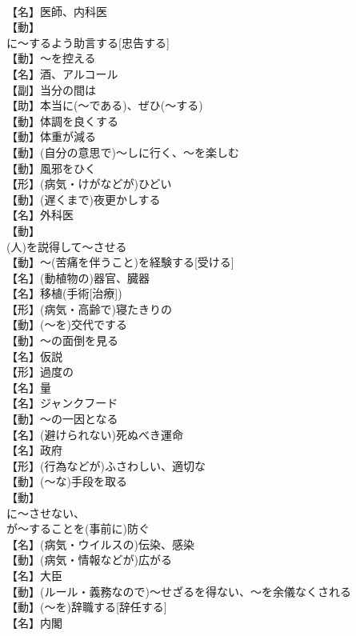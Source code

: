 \documentclass[8pt]{extreport}
\begin{document}
\begin{CJK}{UTF8}{min}
\\	【名】医師、内科医
\\	【動】
\\	に～するよう助言する[忠告する]
\\	【動】～を控える
\\	【名】酒、アルコール
\\	【副】当分の間は
\\	【助】本当に(～である)、ぜひ(～する)
\\	【動】体調を良くする
\\	【動】体重が減る
\\	【動】(自分の意思で)～しに行く、～を楽しむ
\\	【動】風邪をひく
\\	【形】(病気・けがなどが)ひどい
\\	【動】(遅くまで)夜更かしする
\\	【名】外科医
\\	【動】
\\	(人)を説得して～させる
\\	【動】～(苦痛を伴うこと)を経験する[受ける]
\\	【名】(動植物の)器官、臓器
\\	【名】移植(手術[治療])
\\	【形】(病気・高齢で)寝たきりの
\\	【動】(～を)交代でする
\\	【動】～の面倒を見る
\\	【名】仮説
\\	【形】過度の
\\	【名】量
\\	【名】ジャンクフード
\\	【動】～の一因となる
\\	【名】(避けられない)死ぬべき運命
\\	【名】政府
\\	【形】(行為などが)ふさわしい、適切な
\\	【動】(～な)手段を取る
\\	【動】
\\	に～させない、
\\	が～することを(事前に)防ぐ
\\	【名】(病気・ウイルスの)伝染、感染
\\	【動】(病気・情報などが)広がる
\\	【名】大臣
\\	【動】(ルール・義務なので)～せざるを得ない、～を余儀なくされる
\\	【動】(～を)辞職する[辞任する]
\\	【名】内閣

\end{CJK}
\end{document}
